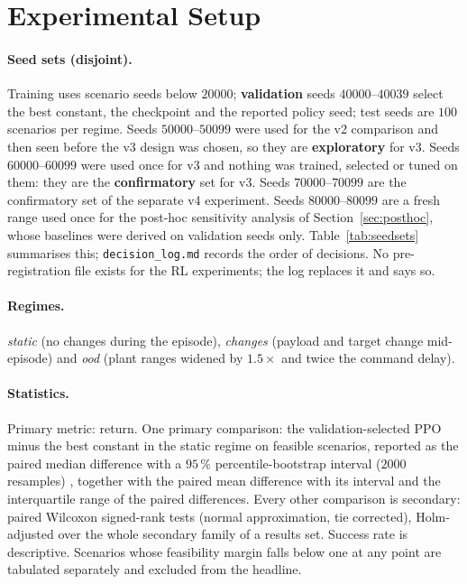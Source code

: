 \section{Experimental Setup}\label{sec:setup}
\paragraph*{Seed sets (disjoint).} Training uses scenario seeds below $20000$; \textbf{validation} seeds $40000$--$40039$ select the best constant, the checkpoint and the reported policy seed; test seeds are $100$ scenarios per regime. Seeds $50000$--$50099$ were used for the v2 comparison and then seen before the v3 design was chosen, so they are \textbf{exploratory} for v3. Seeds $60000$--$60099$ were used once for v3 and nothing was trained, selected or tuned on them: they are the \textbf{confirmatory} set for v3. Seeds $70000$--$70099$ are the confirmatory set of the separate v4 experiment. Seeds $80000$--$80099$ are a fresh range used once for the post-hoc sensitivity analysis of Section~\ref{sec:posthoc}, whose baselines were derived on validation seeds only. Table~\ref{tab:seedsets} summarises this; \texttt{decision\_log.md} records the order of decisions. No pre-registration file exists for the RL experiments; the log replaces it and says so.

\paragraph*{Regimes.} \emph{static} (no changes during the episode), \emph{changes} (payload and target change mid-episode) and \emph{ood} (plant ranges widened by $1.5\times$ and twice the command delay).

\paragraph*{Statistics.} Primary metric: return. One primary comparison: the validation-selected PPO minus the best constant in the static regime on feasible scenarios, reported as the paired median difference with a $95\,\%$ percentile-bootstrap interval ($2000$ resamples) \cite{efron1979bootstrap}, together with the paired mean difference with its interval and the interquartile range of the paired differences. Every other comparison is secondary: paired Wilcoxon signed-rank tests \cite{wilcoxon1945individual} (normal approximation, tie corrected), Holm-adjusted \cite{holm1979simple} over the whole secondary family of a results set. Success rate is descriptive. Scenarios whose feasibility margin falls below one at any point are tabulated separately and excluded from the headline.

